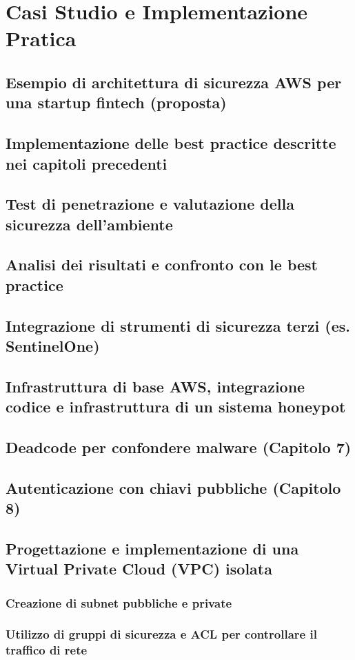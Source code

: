 \documentclass[a4paper,12pt]{report}
\begin{document}
\chapter{Casi Studio e Implementazione Pratica}
\section{Esempio di architettura di sicurezza AWS per una startup fintech (proposta)}
\section{Implementazione delle best practice descritte nei capitoli precedenti}
\section{Test di penetrazione e valutazione della sicurezza dell'ambiente}
\section{Analisi dei risultati e confronto con le best practice}
\section{Integrazione di strumenti di sicurezza terzi (es. SentinelOne)}
\section{Infrastruttura di base AWS, integrazione codice e infrastruttura di un sistema honeypot}
\section{Deadcode per confondere malware (Capitolo 7)}
\section{Autenticazione con chiavi pubbliche (Capitolo 8)}
\section{Progettazione e implementazione di una Virtual Private Cloud (VPC) isolata}
\subsection{Creazione di subnet pubbliche e private}
\subsection{Utilizzo di gruppi di sicurezza e ACL per controllare il traffico di rete}
\end{document}
